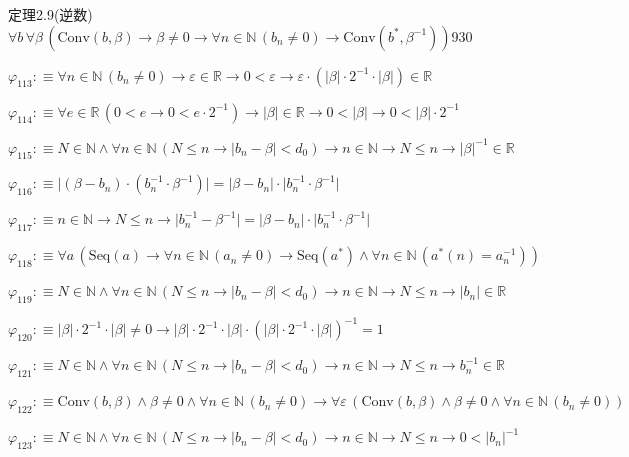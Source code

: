 \begin{fullproof}{定理2.9(逆数)}{$\forall b\,\forall \beta\,(\mathrm{Conv}(b,\beta) \to \beta \neq 0 \to \forall n \in \mathbb{N}\,(b_{n} \neq 0) \to \mathrm{Conv}(b^{\ast},\beta^{-1}))$}{930}
\begin{abbrevlist}
\item $\varphi_{113} :\equiv \forall n \in \mathbb{N}\,(b_{n} \neq 0) \to \varepsilon \in \mathbb{R} \to 0 < \varepsilon \to \varepsilon \cdot (\lvert \beta \rvert \cdot 2^{-1} \cdot \lvert \beta \rvert) \in \mathbb{R}$
\item $\varphi_{114} :\equiv \forall e \in \mathbb{R}\,(0 < e \to 0 < e \cdot 2^{-1}) \to \lvert \beta \rvert \in \mathbb{R} \to 0 < \lvert \beta \rvert \to 0 < \lvert \beta \rvert \cdot 2^{-1}$
\item $\varphi_{115} :\equiv N \in \mathbb{N} \land \forall n \in \mathbb{N}\,(N \leq n \to \lvert b_{n} - \beta \rvert < d_{0}) \to n \in \mathbb{N} \to N \leq n \to \lvert \beta \rvert^{-1} \in \mathbb{R}$
\item $\varphi_{116} :\equiv \lvert (\beta - b_{n}) \cdot (b_{n}^{-1} \cdot \beta^{-1}) \rvert = \lvert \beta - b_{n} \rvert \cdot \lvert b_{n}^{-1} \cdot \beta^{-1} \rvert$
\item $\varphi_{117} :\equiv n \in \mathbb{N} \to N \leq n \to \lvert b_{n}^{-1} - \beta^{-1} \rvert = \lvert \beta - b_{n} \rvert \cdot \lvert b_{n}^{-1} \cdot \beta^{-1} \rvert$
\item $\varphi_{118} :\equiv \forall a\,(\mathrm{Seq}(a) \to \forall n \in \mathbb{N}\,(a_{n} \neq 0) \to \mathrm{Seq}(a^{\ast}) \land \forall n \in \mathbb{N}\,(a^{\ast}(n) = a_{n}^{-1}))$
\item $\varphi_{119} :\equiv N \in \mathbb{N} \land \forall n \in \mathbb{N}\,(N \leq n \to \lvert b_{n} - \beta \rvert < d_{0}) \to n \in \mathbb{N} \to N \leq n \to \lvert b_{n} \rvert \in \mathbb{R}$
\item $\varphi_{120} :\equiv \lvert \beta \rvert \cdot 2^{-1} \cdot \lvert \beta \rvert \neq 0 \to \lvert \beta \rvert \cdot 2^{-1} \cdot \lvert \beta \rvert \cdot (\lvert \beta \rvert \cdot 2^{-1} \cdot \lvert \beta \rvert)^{-1} = 1$
\item $\varphi_{121} :\equiv N \in \mathbb{N} \land \forall n \in \mathbb{N}\,(N \leq n \to \lvert b_{n} - \beta \rvert < d_{0}) \to n \in \mathbb{N} \to N \leq n \to b_{n}^{-1} \in \mathbb{R}$
\item $\varphi_{122} :\equiv \mathrm{Conv}(b,\beta) \land \beta \neq 0 \land \forall n \in \mathbb{N}\,(b_{n} \neq 0) \to \forall \varepsilon\,(\mathrm{Conv}(b,\beta) \land \beta \neq 0 \land \forall n \in \mathbb{N}\,(b_{n} \neq 0))$
\item $\varphi_{123} :\equiv N \in \mathbb{N} \land \forall n \in \mathbb{N}\,(N \leq n \to \lvert b_{n} - \beta \rvert < d_{0}) \to n \in \mathbb{N} \to N \leq n \to 0 < \lvert b_{n} \rvert^{-1}$

\end{abbrevlist}
\end{fullproof}
